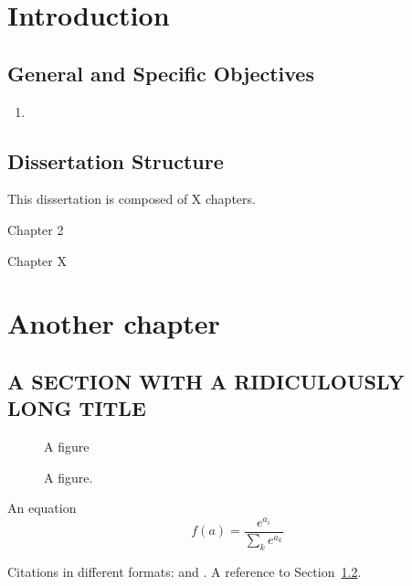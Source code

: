 \documentclass[12pt]{book}
\renewcommand{\&}{\textup{\symbol{`\&}}}
\begin{document}

\tableofcontents
\listoffigures
\listoftables

\chapter{Introduction}
\label{ch:intro}
\renewcommand{\thepage}{\arabic{page}}%



\section{General and Specific Objectives}
\label{General and specific objectives}


\begin{enumerate}
\item 
\end{enumerate}


\section{Dissertation Structure}
\label{sec:ch1_diss-structure}

This dissertation is composed of X chapters.

Chapter 2 

Chapter X


\chapter{Another chapter}


\section[SECTION WITH LONG TITLE]{A SECTION WITH A 
RIDICULOUSLY LONG TITLE}
\label{sec:ch2_long_title}


\begin{figure}[t]
\centering
A figure
\caption{A figure.}
\label{fig:nn}
\end{figure}


An equation
\begin{equation}
f(a) = \frac{e^{a_i}}{\sum_{k}^{} e^{a_k}}
\end{equation}

Citations in different formats: \citep{lane2019natural} and  
\citet{jones1972statistical}. A reference to 
Section~\ref{sec:ch1_diss-structure}.
\end{document}
